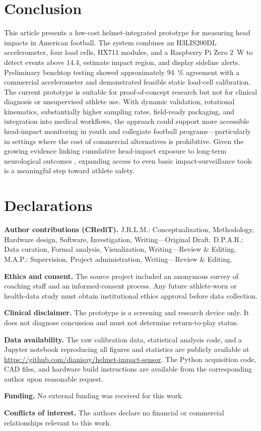 \documentclass[11pt]{article}
\begin{document}
\section{Conclusion}
This article presents a low-cost helmet-integrated prototype for measuring head impacts in American football. The system combines an H3LIS200DL accelerometer, four load cells, HX711 modules, and a Raspberry Pi Zero 2~W to detect events above \SI{14.4}{\gee}, estimate impact region, and display sideline alerts. Preliminary benchtop testing showed approximately \SI{94}{\percent} agreement with a commercial accelerometer and demonstrated feasible static load-cell calibration. The current prototype is suitable for proof-of-concept research but not for clinical diagnosis or unsupervised athlete use. With dynamic validation, rotational kinematics, substantially higher sampling rates, field-ready packaging, and integration into medical workflows, the approach could support more accessible head-impact monitoring in youth and collegiate football programs---particularly in settings where the cost of commercial alternatives is prohibitive. Given the growing evidence linking cumulative head-impact exposure to long-term neurological outcomes \citep{alosco2023duration,mckee2023neuropathology}, expanding access to even basic impact-surveillance tools is a meaningful step toward athlete safety.

\section*{Declarations}

\noindent\textbf{Author contributions (CRediT).}
J.R.L.M.: Conceptualization, Methodology, Hardware design, Software, Investigation, Writing---Original Draft. D.P.A.R.: Data curation, Formal analysis, Visualization, Writing---Review \& Editing. M.A.P.: Supervision, Project administration, Writing---Review \& Editing.

\noindent\textbf{Ethics and consent.} The source project included an anonymous survey of coaching staff and an informed-consent process. Any future athlete-worn or health-data study must obtain institutional ethics approval before data collection.

\noindent\textbf{Clinical disclaimer.} The prototype is a screening and research device only. It does not diagnose concussion and must not determine return-to-play status.

\noindent\textbf{Data availability.} The raw calibration data, statistical analysis code, and a Jupyter notebook reproducing all figures and statistics are publicly available at \url{https://github.com/dianisay/helmet-impact-sensor}. The Python acquisition code, CAD files, and hardware build instructions are available from the corresponding author upon reasonable request.

\noindent\textbf{Funding.} No external funding was received for this work.

\noindent\textbf{Conflicts of interest.} The authors declare no financial or commercial relationships relevant to this work.



\end{document}
